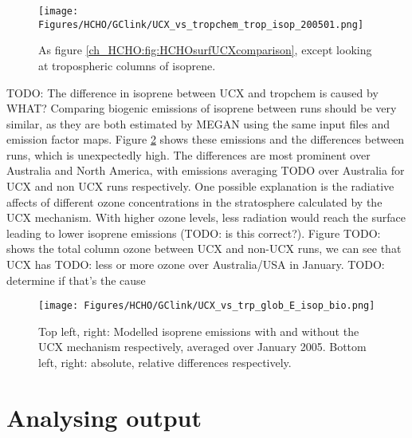     \begin{figure}%
      \texttt{[image: Figures/HCHO/GClink/UCX\_vs\_tropchem\_trop\_isop\_200501.png]}
      \caption{%
        As figure \ref{ch_HCHO:fig:HCHOsurfUCXcomparison}, except looking at tropospheric columns of isoprene.
      }
      \label{ch_HCHO:fig:isoptropUCXcomparison}
    \end{figure}
    
    TODO: The difference in isoprene between UCX and tropchem is caused by WHAT?
    Comparing biogenic emissions of isoprene between runs should be very similar, as they are both estimated by MEGAN using the same input files and emission factor maps.
    Figure \ref{ch_HCHO:fig:UCX_trp_biogenic_isoprene_diffs} shows these emissions and the differences between runs, which is unexpectedly high.
    The differences are most prominent over Australia and North America, with emissions averaging TODO over Australia for UCX and non UCX runs respectively.
    One possible explanation is the radiative affects of different ozone concentrations in the stratosphere calculated by the UCX mechanism. 
    With higher ozone levels, less radiation would reach the surface leading to lower isoprene emissions (TODO: is this correct?).
    Figure TODO: shows the total column ozone between UCX and non-UCX runs, we can see that UCX has TODO: less or more ozone over Australia/USA in January.
    TODO: determine if that's the cause
    
    \begin{figure}%
      \texttt{[image: Figures/HCHO/GClink/UCX\_vs\_trp\_glob\_E\_isop\_bio.png]}
      \caption{%
        Top left, right: Modelled isoprene emissions with and without the UCX mechanism respectively, averaged over January 2005.
        Bottom left, right: absolute, relative differences respectively.
      }
      \label{ch_HCHO:fig:UCX_trp_biogenic_isoprene_diffs}
    \end{figure}

\section{Analysing output}

      
      